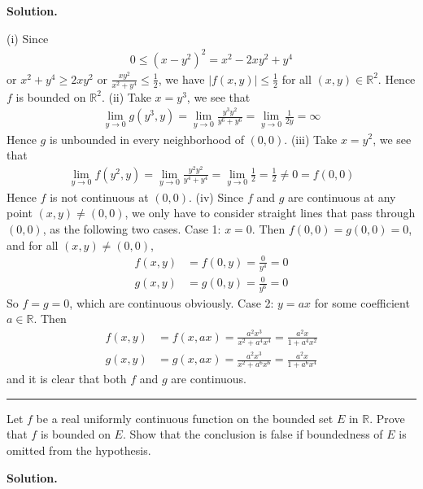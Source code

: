 \documentclass[12pt]{article}
\theoremstyle{definition}
\begin{document}
\smallskip
\noindent\textbf{Solution.}\quad

(i) Since
\begin{align*}
0\le(x-y^2)^2=x^2-2xy^2+y^4
\end{align*}
or $x^2+y^4\ge 2xy^2$ or $\frac{xy^2}{x^2+y^4}\le\frac{1}{2}$, we have $\left\vert f(x,y)\right\vert\le\frac{1}{2}$ for all $(x,y)\in \mathbb{R}^2$. Hence $f$ is bounded on $\mathbb{R}^2$.
(ii) Take $x=y^3$, we see that
\begin{align*}
\lim_{y\to 0}g(y^3,y)=\lim_{y\to 0}\frac{y^3y^2}{y^6+y^6}=\lim_{y\to 0}\frac{1}{2y}=\infty
\end{align*}
Hence $g$ is unbounded in every neighborhood of $(0,0)$.
(iii) Take $x=y^2$, we see that
\begin{align*}
\lim_{y\to 0}f(y^2,y)=\lim_{y\to 0}\frac{y^2y^2}{y^4+y^4}=\lim_{y\to 0}\frac{1}{2}=\frac{1}{2}\ne 0=f(0,0)
\end{align*}
Hence $f$ is not continuous at $(0,0)$.
(iv) Since $f$ and $g$ are continuous at any point $(x,y)\ne(0,0)$, we only have to consider straight lines that pass through $(0,0)$, as the following two cases.
Case 1: $x=0$. Then $f(0,0)=g(0,0)=0$, and for all $(x,y)\ne(0,0)$,
\begin{align*}
f(x,y)&=f(0,y)=\frac{0}{y^4}=0 \\
g(x,y)&=g(0,y)=\frac{0}{y^6}=0
\end{align*}
So $f=g=0$, which are continuous obviously.
Case 2: $y=ax$ for some coefficient $a\in \mathbb{R}$. Then
\begin{align*}
f(x,y)&=f(x,ax)=\frac{a^2x^3}{x^2+a^4x^4}=\frac{a^2x}{1+a^4x^2} \\
g(x,y)&=g(x,ax)=\frac{a^2x^3}{x^2+a^6x^6}=\frac{a^2x}{1+a^6x^4}
\end{align*}
and it is clear that both $f$ and $g$ are continuous.



\bigskip\noindent\hrule\bigskip

Let $f$ be a real uniformly continuous function on the bounded set $E$ in $\mathbb{R}$. Prove that $f$ is bounded on $E$.
Show that the conclusion is false if boundedness of $E$ is omitted from the hypothesis.

\smallskip
\noindent\textbf{Solution.}\quad
\end{document}
